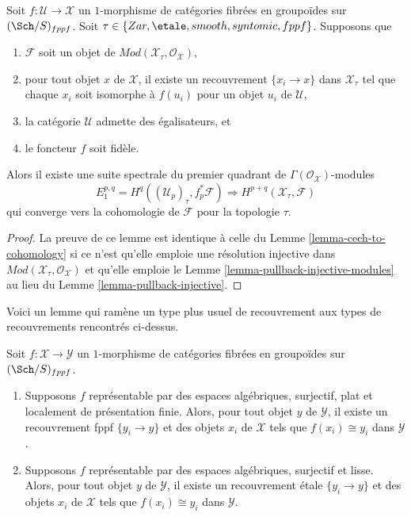 \begin{lemma}
\label{lemma-cech-to-cohomology-modules}
Soit $f : \mathcal{U} \to \mathcal{X}$ un $1$-morphisme de catégories fibrées
en groupoïdes sur $(\Sch/S)_{fppf}$. Soit
$\tau \in \{Zar, \etale, smooth, syntomic, fppf\}$.
Supposons que
\begin{enumerate}
\item $\mathcal{F}$ soit un objet de
$\textit{Mod}(\mathcal{X}_\tau, \mathcal{O}_\mathcal{X})$,
\item pour tout objet $x$ de $\mathcal{X}$, il existe un recouvrement
$\{x_i \to x\}$ dans $\mathcal{X}_\tau$ tel que chaque $x_i$ soit isomorphe
à $f(u_i)$ pour un objet $u_i$ de $\mathcal{U}$,
\item la catégorie $\mathcal{U}$ admette des égalisateurs, et
\item le foncteur $f$ soit fidèle.
\end{enumerate}
Alors il existe une suite spectrale du premier quadrant de
$\Gamma(\mathcal{O}_\mathcal{X})$-modules
$$
E_1^{p, q} = H^q((\mathcal{U}_p)_\tau, f_p^*\mathcal{F})
\Rightarrow
H^{p + q}(\mathcal{X}_\tau, \mathcal{F})
$$
qui converge vers la cohomologie de $\mathcal{F}$ pour la topologie $\tau$.
\end{lemma}

\begin{proof}
La preuve de ce lemme est identique à celle du
Lemme \ref{lemma-cech-to-cohomology}
si ce n'est qu'elle emploie une résolution injective dans
$\textit{Mod}(\mathcal{X}_\tau, \mathcal{O}_\mathcal{X})$
et qu'elle emploie le
Lemme \ref{lemma-pullback-injective-modules}
au lieu du
Lemme \ref{lemma-pullback-injective}.
\end{proof}

\noindent
Voici un lemme qui ramène un type plus usuel de recouvrement aux
types de recouvrements rencontrés ci-dessus.

\begin{lemma}
\label{lemma-surjective-flat-locally-finite-presentation}
Soit $f : \mathcal{X} \to \mathcal{Y}$ un $1$-morphisme de
catégories fibrées en groupoïdes sur $(\Sch/S)_{fppf}$.
\begin{enumerate}
\item Supposons $f$ représentable par des espaces algébriques, surjectif,
plat et localement de présentation finie. Alors, pour tout objet $y$ de
$\mathcal{Y}$, il existe un recouvrement fppf $\{y_i \to y\}$ et des objets
$x_i$ de $\mathcal{X}$ tels que $f(x_i) \cong y_i$ dans $\mathcal{Y}$.
\item Supposons $f$ représentable par des espaces algébriques, surjectif
et lisse. Alors, pour tout objet $y$ de
$\mathcal{Y}$, il existe un recouvrement \'etale $\{y_i \to y\}$ et des objets
$x_i$ de $\mathcal{X}$ tels que $f(x_i) \cong y_i$ dans $\mathcal{Y}$.
\end{enumerate}
\end{lemma}

